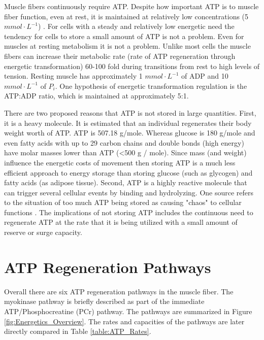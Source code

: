 Muscle fibers continuously require ATP. Despite how important ATP is to muscle fiber function, even at rest, it is maintained at relatively low concentrations (5 $mmol \cdot L^{-1}$) \cite{feher_quantitative_2017, jones_skeletal_2006}. For cells with a steady and relatively low energetic need the tendency for cells to store a small amount of ATP is not a problem. Even for muscles at resting metabolism it is not a problem. Unlike most cells the muscle fibers can increase their metabolic rate (rate of ATP regeneration through energetic transformation) 60-100 fold during transitions from rest to high levels of tension. Resting muscle has approximately 1 $mmol \cdot L^{-1}$ of ADP and 10 $mmol \cdot L^{-1}$ of $P_i$. One hypothesis of energetic transformation regulation is the ATP:ADP ratio, which is maintained at approximately 5:1.

There are two proposed reasons that ATP is not stored in large quantities. First, it is a heavy molecule. It is estimated that an individual regenerates their body weight worth of ATP. ATP is 507.18 g/mole. Whereas glucose is 180 g/mole and even fatty acids with up to 29 carbon chains and double bonds (high energy) have molar masses lower than ATP (<500 g / mole). Since mass (and weight) influence the energetic costs of movement then storing ATP is a much less efficient approach to energy storage than storing glucose (such as glycogen) and fatty acids (as adipose tissue). Second, ATP is a highly reactive molecule that can trigger several cellular events by binding and hydrolyzing. One source refers to the situation of too much ATP being stored as causing "chaos" to cellular functions \cite{jones_skeletal_2006}. The implications of not storing ATP includes the continuous need to regenerate ATP at the rate that it is being utilized with a small amount of reserve or surge capacity.



\section{ATP Regeneration Pathways}

Overall there are six ATP regeneration pathways in the muscle fiber. The myokinase pathway is briefly described as part of the immediate ATP/Phosphocreatine (PCr) pathway. The pathways are summarized in Figure \ref{fig:Energetics_Overview}. The rates and capacities of the pathways are later directly compared in Table \ref{table:ATP_Rates}. 


